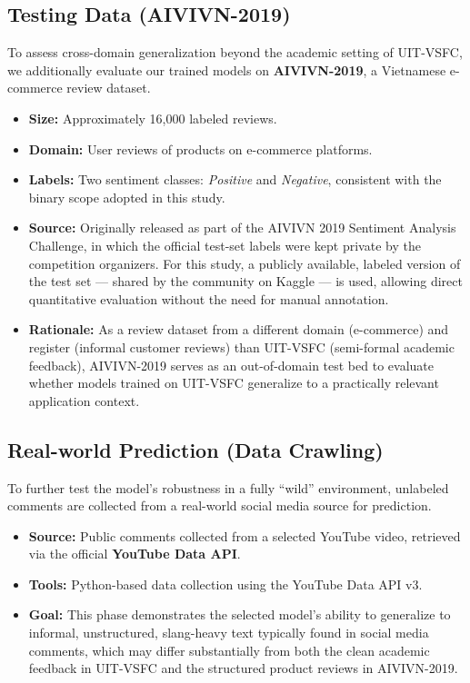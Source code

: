 \documentclass[12pt]{report} %
\begin{document}
\subsection{Testing Data (AIVIVN-2019)}
To assess cross-domain generalization beyond the academic setting of UIT-VSFC, we additionally evaluate our trained models on \textbf{AIVIVN-2019}, a Vietnamese e-commerce review dataset.
\begin{itemize}
    \item \textbf{Size:} Approximately 16,000 labeled reviews.
    \item \textbf{Domain:} User reviews of products on e-commerce platforms.
    \item \textbf{Labels:} Two sentiment classes: \textit{Positive} and \textit{Negative}, consistent with the binary scope adopted in this study.
    \item \textbf{Source:} Originally released as part of the AIVIVN 2019 Sentiment Analysis Challenge, in which the official test-set labels were kept private by the competition organizers. For this study, a publicly available, labeled version of the test set --- shared by the community on Kaggle --- is used, allowing direct quantitative evaluation without the need for manual annotation.
    \item \textbf{Rationale:} As a review dataset from a different domain (e-commerce) and register (informal customer reviews) than UIT-VSFC (semi-formal academic feedback), AIVIVN-2019 serves as an out-of-domain test bed to evaluate whether models trained on UIT-VSFC generalize to a practically relevant application context.
\end{itemize}

\subsection{Real-world Prediction (Data Crawling)}
To further test the model's robustness in a fully ``wild'' environment, unlabeled comments are collected from a real-world social media source for prediction.
\begin{itemize}
    \item \textbf{Source:} Public comments collected from a selected YouTube video, retrieved via the official \textbf{YouTube Data API}.
    \item \textbf{Tools:} Python-based data collection using the YouTube Data API v3.
    \item \textbf{Goal:} This phase demonstrates the selected model's ability to generalize to informal, unstructured, slang-heavy text typically found in social media comments, which may differ substantially from both the clean academic feedback in UIT-VSFC and the structured product reviews in AIVIVN-2019.
\end{itemize}
\end{document}
